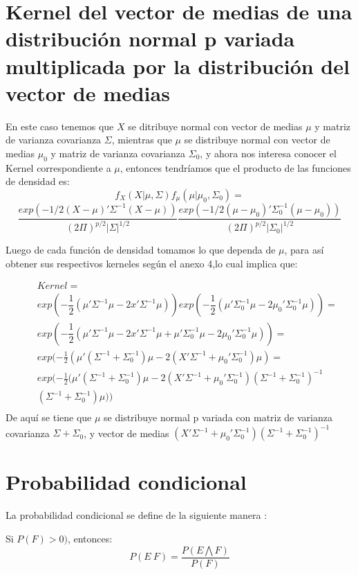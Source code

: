 \section{Kernel del vector de medias de una distribución normal p variada multiplicada por la distribución del vector de medias}

En este caso tenemos que $X$ se ditribuye normal con vector de medias $\mu$ y matriz de varianza covarianza $\Sigma$, mientras que $\mu$ se distribuye normal con vector de medias $\mu_{0}$ y matriz de varianza covarianza $\Sigma_{0}$, y ahora nos interesa conocer el Kernel correspondiente a $\mu$, entonces tendríamos
que el producto de las funciones de densidad es:
\begin{equation*}
f_{X}(X|\mu,\Sigma)f_{\mu}(\mu|\mu_{0},\Sigma_{0})=    
\end{equation*}
\begin{equation*}
\dfrac{exp(-1/2(X-\mu)'\Sigma^{-1}(X-\mu))}{(2\Pi)^{p/2}|\Sigma|^{1/2}}       \dfrac{exp(-1/2(\mu-\mu_{0})'\Sigma_{0}^{-1}(\mu-\mu_{0}))}{(2\Pi)^{p/2}|\Sigma_{0}|^{1/2}}
\end{equation*}

Luego de cada función de densidad tomamos lo que dependa de $\mu$, para así obtener sus respectivos kerneles según el anexo 4,lo cual implica que:

\begin{eqnarray*}
& &Kernel = \\
& &exp(-\dfrac{1}{2}(\mu'\Sigma^{-1}\mu -2x'\Sigma^{-1}\mu))exp(-\dfrac{1}{2}(\mu'\Sigma_{0}^{-1}\mu -2\mu_{0}'\Sigma_{0}^{-1}\mu))=
 \\
& &exp(-\dfrac{1}{2}(\mu'\Sigma^{-1}\mu -2x'\Sigma^{-1}\mu + \mu'\Sigma_{0}^{-1}\mu -2\mu_{0}'\Sigma_{0}^{-1}\mu))=
 \\
& &exp(-\frac{1}{2}(\mu'(\Sigma^{-1}+\Sigma_{0}^{-1})\mu-2(X'\Sigma^{-1}+\mu_{0}'\Sigma_{0}^{-1})\mu)=
 \\
& &exp(-\frac{1}{2}(\mu'(\Sigma^{-1}+\Sigma_{0}^{-1})\mu-2(X'\Sigma^{-1}+\mu_{0}'\Sigma_{0}^{-1})(\Sigma^{-1}+\Sigma_{0}^{-1})^{-1} \\
& &(\Sigma^{-1}+\Sigma_{0}^{-1})\mu))
 \\
\end{eqnarray*}
De aquí se tiene que $\mu$ se distribuye normal p variada con matriz de varianza covarianza $\Sigma + \Sigma_{0}$, y vector de medias $(X'\Sigma^{-1}+\mu_{0}'\Sigma_{0}^{-1})(\Sigma^{-1}+\Sigma_{0}^{-1})^{-1}$

\section{Probabilidad condicional} \label{A.Ross}
La probabilidad condicional se define de la siguiente manera \cite{Ross_P}:

Si $P(F)>0)$, entonces:
\begin{equation*}
P(E\ F)=\frac{P(E\bigwedge F)}{P(F)}
\end{equation*}